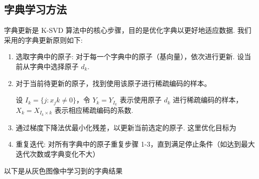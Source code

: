 \documentclass[a4paper,11pt]{article}
\begin{document}
\subsection{字典学习方法}
字典更新是 K-SVD 算法中的核心步骤，目的是优化字典以更好地适应数据. 我们采用的字典更新原则如下: 
\begin{enumerate}
	\item 选取字典中的原子: 对于每一个字典中的原子（基向量），依次进行更新. 设当前从字典中选择原子 $d_k$. 
	\item 对于当前待更新的原子，找到使用该原子进行稀疏编码的样本。
	
	设 $ I_k = \{ j: x_jk \neq 0 \} $，令 $ Y_k = Y_{I_k} $ 表示使用原子 $d_k$ 进行稀疏编码的样本，$X_k = X_{I_k \times k} $ 表示相应稀疏编码的系数.
	
	\item 通过梯度下降法优最小化残差，以更新当前选定的原子. 这里优化目标为
	
	\item 重复迭代: 对所有字典中的原子重复步骤 1-3，直到满足停止条件（如达到最大迭代次数或字典变化不大）
\end{enumerate}

以下是从灰色图像中学习到的字典结果
\end{document}

